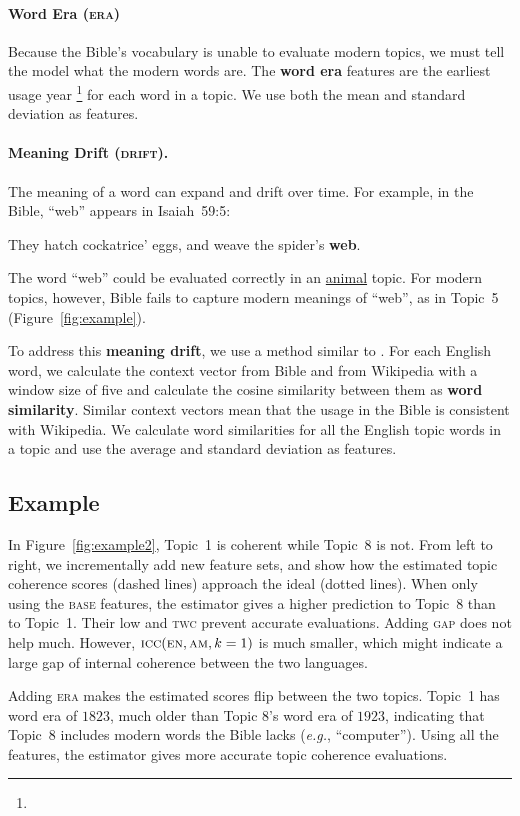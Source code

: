 \paragraph{Word Era (\textsc{era})}

Because the Bible's vocabulary is unable to evaluate modern topics, we
must tell the model what the modern words are.  The \textbf{word era}
features are the earliest usage year
\footnote{} for each word in
a topic.  We use both the mean and standard deviation as features.



\paragraph{Meaning Drift (\textsc{drift}).}

The meaning of a word can expand and drift over time.  For example, in the Bible,
``web'' appears in Isaiah~59:5:
\begin{displayquote}
	They hatch cockatrice' eggs, and weave the spider's \textbf{web}.
\end{displayquote}
The word ``web'' could be evaluated correctly in an \underline{animal}
topic. For modern topics, however, Bible fails to capture modern meanings of ``web'',
as in Topic~5 (Figure~\ref{fig:example}).

To address this \textbf{meaning drift}, we use a
method similar to . For each English
word, we calculate the context vector from Bible and from Wikipedia
with a window size of five and calculate the cosine similarity between
them as \textbf{word similarity}.  Similar context vectors mean
that the usage in the Bible is consistent with Wikipedia.
We calculate word similarities for all the English topic words in a
topic and use the average and standard deviation as features.

\subsection{Example}


	
	



	

In Figure~\ref{fig:example2}, Topic~1 is coherent while Topic~8 is
not. From left to right, we incrementally add new feature sets, and
show how the estimated topic coherence scores (dashed lines) approach
the ideal \cnpmi{} (dotted lines). When only using the \textsc{base}
features, the estimator gives a higher prediction to Topic~8 than to
Topic~1. Their low \mta{} and \textsc{twc} prevent accurate
evaluations.  Adding \textsc{gap} does not help much.  However,
$\textsc{icc}{}(\textsc{en},\textsc{am},k=1)$ is much smaller, which might
indicate a large gap of internal coherence between the two languages.

Adding \textsc{era} makes the estimated scores flip between the two
topics.  Topic~1 has word era of $1823$, much older than Topic 8's
word era of $1923$, indicating that Topic~8 includes modern words the
Bible lacks (\textit{e.g.}, ``computer'').  Using all the features,
the estimator gives more accurate topic coherence evaluations.
